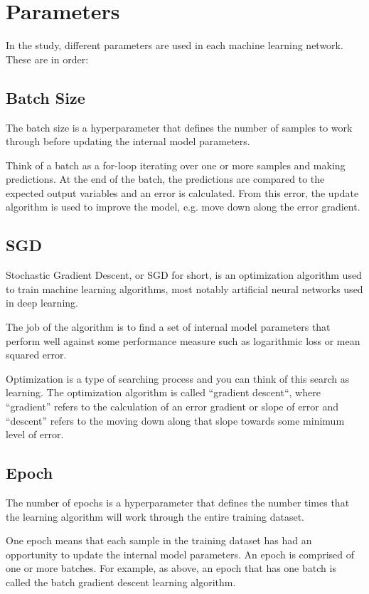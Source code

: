 \section{Parameters}
In the study, different parameters are used in each machine learning network. These are in order:
\subsection{Batch Size}
The batch size is a hyperparameter that defines the number of samples to work through before updating the internal model parameters.\par

Think of a batch as a for-loop iterating over one or more samples and making predictions. At the end of the batch, the predictions are compared to the expected output variables and an error is calculated. From this error, the update algorithm is used to improve the model, e.g. move down along the error gradient.\par
\subsection{SGD}
Stochastic Gradient Descent, or SGD for short, is an optimization algorithm used to train machine learning algorithms, most notably artificial neural networks used in deep learning. \par
The job of the algorithm is to find a set of internal model parameters that perform well against some performance measure such as logarithmic loss or mean squared error. \par
Optimization is a type of searching process and you can think of this search as learning. The optimization algorithm is called “gradient descent“, where “gradient” refers to the calculation of an error gradient or slope of error and “descent” refers to the moving down along that slope towards some minimum level of error. \par
\subsection{Epoch}
The number of epochs is a hyperparameter that defines the number times that the learning algorithm will work through the entire training dataset. \par

One epoch means that each sample in the training dataset has had an opportunity to update the internal model parameters. An epoch is comprised of one or more batches. For example, as above, an epoch that has one batch is called the batch gradient descent learning algorithm.\par